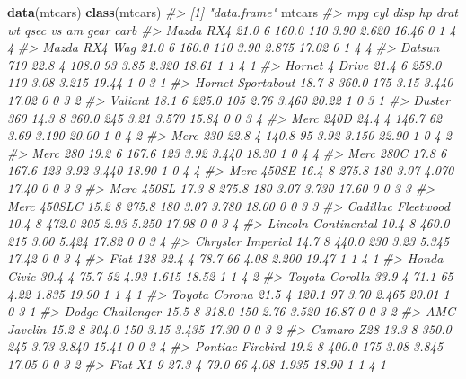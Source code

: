 \documentclass[]{book}
\newenvironment{Shaded}{}{}
\newcommand{\CommentTok}[1]{\textcolor[rgb]{0.38,0.63,0.69}{\textit{#1}}}
\newcommand{\KeywordTok}[1]{\textcolor[rgb]{0.00,0.44,0.13}{\textbf{#1}}}
\newcommand{\NormalTok}[1]{#1}
\theoremstyle{definition}
\theoremstyle{definition}
\theoremstyle{definition}
\theoremstyle{remark}
\begin{document}
\begin{Shaded}
\begin{Highlighting}[]
\KeywordTok{data}\NormalTok{(mtcars)}
\KeywordTok{class}\NormalTok{(mtcars)}
\CommentTok{#> [1] "data.frame"}
\NormalTok{mtcars}
\CommentTok{#>                      mpg cyl  disp  hp drat    wt  qsec vs am gear carb}
\CommentTok{#> Mazda RX4           21.0   6 160.0 110 3.90 2.620 16.46  0  1    4    4}
\CommentTok{#> Mazda RX4 Wag       21.0   6 160.0 110 3.90 2.875 17.02  0  1    4    4}
\CommentTok{#> Datsun 710          22.8   4 108.0  93 3.85 2.320 18.61  1  1    4    1}
\CommentTok{#> Hornet 4 Drive      21.4   6 258.0 110 3.08 3.215 19.44  1  0    3    1}
\CommentTok{#> Hornet Sportabout   18.7   8 360.0 175 3.15 3.440 17.02  0  0    3    2}
\CommentTok{#> Valiant             18.1   6 225.0 105 2.76 3.460 20.22  1  0    3    1}
\CommentTok{#> Duster 360          14.3   8 360.0 245 3.21 3.570 15.84  0  0    3    4}
\CommentTok{#> Merc 240D           24.4   4 146.7  62 3.69 3.190 20.00  1  0    4    2}
\CommentTok{#> Merc 230            22.8   4 140.8  95 3.92 3.150 22.90  1  0    4    2}
\CommentTok{#> Merc 280            19.2   6 167.6 123 3.92 3.440 18.30  1  0    4    4}
\CommentTok{#> Merc 280C           17.8   6 167.6 123 3.92 3.440 18.90  1  0    4    4}
\CommentTok{#> Merc 450SE          16.4   8 275.8 180 3.07 4.070 17.40  0  0    3    3}
\CommentTok{#> Merc 450SL          17.3   8 275.8 180 3.07 3.730 17.60  0  0    3    3}
\CommentTok{#> Merc 450SLC         15.2   8 275.8 180 3.07 3.780 18.00  0  0    3    3}
\CommentTok{#> Cadillac Fleetwood  10.4   8 472.0 205 2.93 5.250 17.98  0  0    3    4}
\CommentTok{#> Lincoln Continental 10.4   8 460.0 215 3.00 5.424 17.82  0  0    3    4}
\CommentTok{#> Chrysler Imperial   14.7   8 440.0 230 3.23 5.345 17.42  0  0    3    4}
\CommentTok{#> Fiat 128            32.4   4  78.7  66 4.08 2.200 19.47  1  1    4    1}
\CommentTok{#> Honda Civic         30.4   4  75.7  52 4.93 1.615 18.52  1  1    4    2}
\CommentTok{#> Toyota Corolla      33.9   4  71.1  65 4.22 1.835 19.90  1  1    4    1}
\CommentTok{#> Toyota Corona       21.5   4 120.1  97 3.70 2.465 20.01  1  0    3    1}
\CommentTok{#> Dodge Challenger    15.5   8 318.0 150 2.76 3.520 16.87  0  0    3    2}
\CommentTok{#> AMC Javelin         15.2   8 304.0 150 3.15 3.435 17.30  0  0    3    2}
\CommentTok{#> Camaro Z28          13.3   8 350.0 245 3.73 3.840 15.41  0  0    3    4}
\CommentTok{#> Pontiac Firebird    19.2   8 400.0 175 3.08 3.845 17.05  0  0    3    2}
\CommentTok{#> Fiat X1-9           27.3   4  79.0  66 4.08 1.935 18.90  1  1    4    1}

\end{Highlighting}
\end{Shaded}
\end{document}
